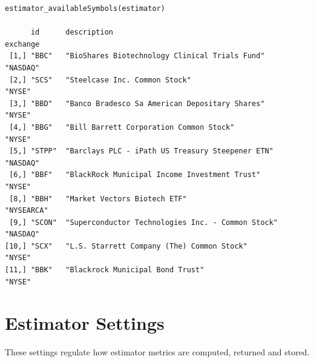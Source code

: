 \documentclass[letterpaper]{report}
\newcounter{N}
\begin{document}
\begin{lstlisting}
estimator_availableSymbols(estimator)

      id      description                                                 exchange  
 [1,] "BBC"   "BioShares Biotechnology Clinical Trials Fund"              "NASDAQ"  
 [2,] "SCS"   "Steelcase Inc. Common Stock"                               "NYSE"    
 [3,] "BBD"   "Banco Bradesco Sa American Depositary Shares"              "NYSE"    
 [4,] "BBG"   "Bill Barrett Corporation Common Stock"                     "NYSE"    
 [5,] "STPP"  "Barclays PLC - iPath US Treasury Steepener ETN"            "NASDAQ"  
 [6,] "BBF"   "BlackRock Municipal Income Investment Trust"               "NYSE"      
 [8,] "BBH"   "Market Vectors Biotech ETF"                                "NYSEARCA"
 [9,] "SCON"  "Superconductor Technologies Inc. - Common Stock"           "NASDAQ"  
[10,] "SCX"   "L.S. Starrett Company (The) Common Stock"                  "NYSE"    
[11,] "BBK"   "Blackrock Municipal Bond Trust"                            "NYSE"  
\end{lstlisting}

\chapter{Estimator Settings}

These settings regulate how estimator metrics are computed, returned and stored.
\end{document}
